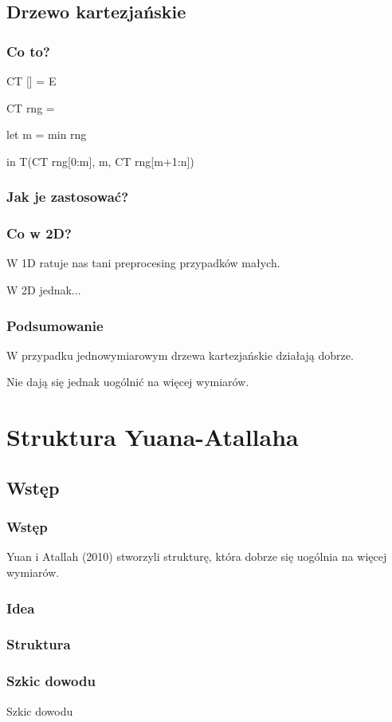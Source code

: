 \documentclass{beamer}
\begin{document}
\subsection{Drzewo kartezjańskie}
\begin{frame} \frametitle{Co to?}
 CT [] = E
 
 CT rng = 
 
 let m = min rng
 
 in T(CT rng[0:m], m, CT rng[m+1:n])
\end{frame}

\begin{frame} \frametitle{Jak je zastosować?}
 
\end{frame}

\begin{frame} \frametitle{Co w 2D?}
 W 1D ratuje nas tani preprocesing przypadków małych.
 
 W 2D jednak...
\end{frame}

\begin{frame} \frametitle{Podsumowanie}
 W przypadku jednowymiarowym drzewa kartezjańskie działają dobrze.
 
 Nie dają się jednak uogólnić na więcej wymiarów.
\end{frame}

\section{Struktura Yuana-Atallaha}

\subsection{Wstęp}
\begin{frame} \frametitle{Wstęp}
 Yuan i Atallah (2010) stworzyli strukturę, która dobrze się uogólnia na więcej wymiarów.
\end{frame}

\begin{frame} \frametitle{Idea}
 
\end{frame}

\begin{frame} \frametitle{Struktura}
 
\end{frame}

\begin{frame} \frametitle{Szkic dowodu}
 Szkic dowodu
\end{frame}
\end{document}
